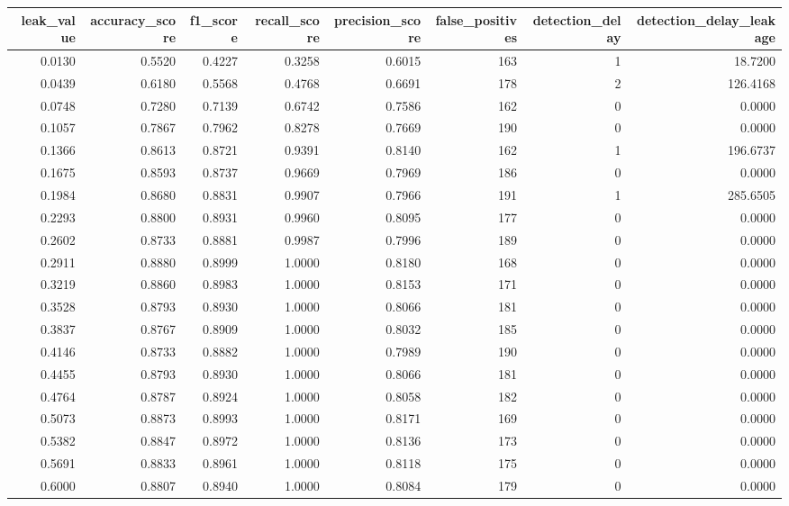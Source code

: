 \begin{tabular}{rrrrrrrr}
\toprule
leak\_value & accuracy\_score & f1\_score & recall\_score & precision\_score & false\_positives & detection\_delay & detection\_delay\_leakage \\
\midrule
0.0130 & 0.5520 & 0.4227 & 0.3258 & 0.6015 & 163 & 1 & 18.7200 \\
0.0439 & 0.6180 & 0.5568 & 0.4768 & 0.6691 & 178 & 2 & 126.4168 \\
0.0748 & 0.7280 & 0.7139 & 0.6742 & 0.7586 & 162 & 0 & 0.0000 \\
0.1057 & 0.7867 & 0.7962 & 0.8278 & 0.7669 & 190 & 0 & 0.0000 \\
0.1366 & 0.8613 & 0.8721 & 0.9391 & 0.8140 & 162 & 1 & 196.6737 \\
0.1675 & 0.8593 & 0.8737 & 0.9669 & 0.7969 & 186 & 0 & 0.0000 \\
0.1984 & 0.8680 & 0.8831 & 0.9907 & 0.7966 & 191 & 1 & 285.6505 \\
0.2293 & 0.8800 & 0.8931 & 0.9960 & 0.8095 & 177 & 0 & 0.0000 \\
0.2602 & 0.8733 & 0.8881 & 0.9987 & 0.7996 & 189 & 0 & 0.0000 \\
0.2911 & 0.8880 & 0.8999 & 1.0000 & 0.8180 & 168 & 0 & 0.0000 \\
0.3219 & 0.8860 & 0.8983 & 1.0000 & 0.8153 & 171 & 0 & 0.0000 \\
0.3528 & 0.8793 & 0.8930 & 1.0000 & 0.8066 & 181 & 0 & 0.0000 \\
0.3837 & 0.8767 & 0.8909 & 1.0000 & 0.8032 & 185 & 0 & 0.0000 \\
0.4146 & 0.8733 & 0.8882 & 1.0000 & 0.7989 & 190 & 0 & 0.0000 \\
0.4455 & 0.8793 & 0.8930 & 1.0000 & 0.8066 & 181 & 0 & 0.0000 \\
0.4764 & 0.8787 & 0.8924 & 1.0000 & 0.8058 & 182 & 0 & 0.0000 \\
0.5073 & 0.8873 & 0.8993 & 1.0000 & 0.8171 & 169 & 0 & 0.0000 \\
0.5382 & 0.8847 & 0.8972 & 1.0000 & 0.8136 & 173 & 0 & 0.0000 \\
0.5691 & 0.8833 & 0.8961 & 1.0000 & 0.8118 & 175 & 0 & 0.0000 \\
0.6000 & 0.8807 & 0.8940 & 1.0000 & 0.8084 & 179 & 0 & 0.0000 \\
\bottomrule
\end{tabular}
